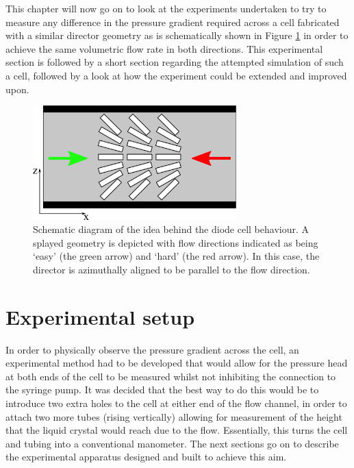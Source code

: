 This chapter will now go on to look at the experiments undertaken to try to measure any difference in the pressure gradient required across a cell fabricated with a similar director geometry as is schematically shown in Figure \ref{fig:schematic_diode} in order to achieve the same volumetric flow rate in both directions. This experimental section is followed by a short section regarding the attempted simulation of such a cell, followed by a look at how the experiment could be extended and improved upon.

\begin{figure}
\begin{center}
\includegraphics[width=0.7\textwidth]{Figures/Diode/schematic_diode}
\end{center}
\caption[Schematic diagram of a splayed `diode' cell]{\label{fig:schematic_diode}Schematic diagram of the idea behind the diode cell behaviour. A splayed geometry is depicted with flow directions indicated as being `easy' (the green arrow) and `hard' (the red arrow). In this case, the director is azimuthally aligned to be parallel to the flow direction.}
\end{figure}

\section{Experimental setup}
\label{sec:experimental_deets}
In order to physically observe the pressure gradient across the cell, an experimental method had to be developed that would allow for the pressure head at both ends of the cell to be measured whilst not inhibiting the connection to the syringe pump. It was decided that the best way to do this would be to introduce two extra holes to the cell at either end of the flow channel, in order to attach two more tubes (rising vertically) allowing for measurement of the height that the liquid crystal would reach due to the flow. Essentially, this turns the cell and tubing into a conventional manometer. The next sections go on to describe the experimental apparatus designed and built to achieve this aim.

